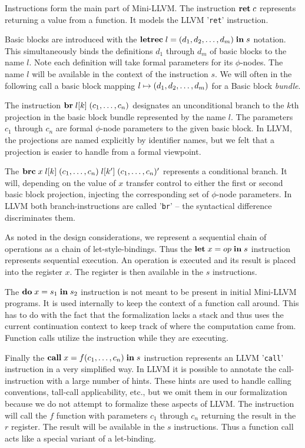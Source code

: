 \documentclass[a4paper, oneside, 10pt, final]{memoir}
\begin{document}
Instructions form the main part of Mini-LLVM. The instruction
$\mathbf{ret} \; c$ represents returning a value from a function. It models the
LLVM '\texttt{ret}' instruction.

Basic blocks are introduced with the $\mathbf{letrec} \; l = (d_1, d_2, \dotsc, d_m) \; \mathbf{in} \; s$
notation. This simultaneously binds the definitions $d_1$ through
$d_m$ of basic blocks to the name $l$. Note each definition will take
formal parameters for its $\phi$-nodes. The name $l$ will be
available in the context of the instruction $s$. We will often in the
following call a basic block mapping $l \mapsto (d_1, d_2, \dotsc, d_m)$
for a Basic block \emph{bundle}.

The instruction $\mathbf{br} \; l[k] \; (c_1, \dotsc, c_n)$ designates an
unconditional branch to the $k$th projection in the basic block bundle
represented by the name $l$. The parameters $c_1$ through $c_n$ are
formal $\phi$-node parameters to the given basic block. In LLVM, the
projections are named explicitly by identifier names, but we felt that
a projection is easier to handle from a formal viewpoint.

The $\mathbf{brc} \; x \; l[k] \; (c_1, \dotsc, c_n) \; l[{k'}] \; (c_1, \dotsc, c_n)'$ represents a conditional
branch. It will, depending on the value of $x$ transfer control to
either the first or second basic block projection, injecting the
corresponding set of $\phi$-node parameters. In LLVM both
branch-instructions are called '\texttt{br}' -- the syntactical
difference discriminates them.

As noted in the design considerations, we represent a sequential chain
of operations as a chain of let-style-bindings. Thus the
$\mathbf{let} \; x = op \; \mathbf{in} \; s$ instruction represents sequential execution. An
operation is executed and its result is placed into the register
$x$. The register is then available in the $s$ instructions.

The $\mathbf{do} \; x = s_1 \; \mathbf{in} \; s_2$ instruction is not meant to be present in
initial Mini-LLVM programs. It is used internally to keep the context
of a function call around. This has to do with the fact that the
formalization lacks a stack and thus uses the current continuation
context to keep track of where the computation came from. Function
calls utilize the instruction while they are executing.

Finally the $\mathbf{call} \; x = f (c_1, \dotsc, c_n)\; \mathbf{in} \; s$ instruction
represents an LLVM '\texttt{call}' instruction in a very simplified
way. In LLVM it is possible to annotate the call-instruction with a
large number of hints. These hints are used to handle calling
conventions, tall-call applicability, etc., but we omit them in our
formalization because we do not attempt to formalize these aspects of
LLVM. The instruction will call the $f$ function with parameters $c_1$
through $c_n$ returning the result in the $r$ register. The result
will be available in the $s$ instructions. Thus a function call acts
like a special variant of a let-binding.
\end{document}
